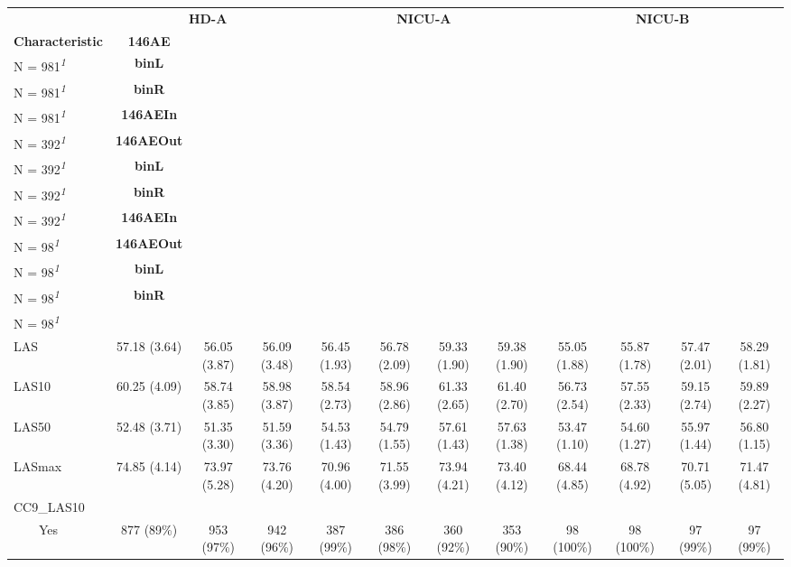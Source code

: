 \begin{table}
\fontsize{12.0pt}{14.4pt}\selectfont
\begin{tabular*}{\linewidth}{@{\extracolsep{\fill}}lccccccccccc}
\toprule
 & \multicolumn{3}{c}{\textbf{HD-A}} & \multicolumn{4}{c}{\textbf{NICU-A}} & \multicolumn{4}{c}{\textbf{NICU-B}} \\ 
\cmidrule(lr){2-4} \cmidrule(lr){5-8} \cmidrule(lr){9-12}
\textbf{Characteristic} & \textbf{146AE}\\
N = 981\textsuperscript{\textit{1}} & \textbf{binL}\\
N = 981\textsuperscript{\textit{1}} & \textbf{binR}\\
N = 981\textsuperscript{\textit{1}} & \textbf{146AEIn}\\
N = 392\textsuperscript{\textit{1}} & \textbf{146AEOut}\\
N = 392\textsuperscript{\textit{1}} & \textbf{binL}\\
N = 392\textsuperscript{\textit{1}} & \textbf{binR}\\
N = 392\textsuperscript{\textit{1}} & \textbf{146AEIn}\\
N = 98\textsuperscript{\textit{1}} & \textbf{146AEOut}\\
N = 98\textsuperscript{\textit{1}} & \textbf{binL}\\
N = 98\textsuperscript{\textit{1}} & \textbf{binR}\\
N = 98\textsuperscript{\textit{1}} \\ 
\midrule\addlinespace[2.5pt]
LAS & 57.18 (3.64) & 56.05 (3.87) & 56.09 (3.48) & 56.45 (1.93) & 56.78 (2.09) & 59.33 (1.90) & 59.38 (1.90) & 55.05 (1.88) & 55.87 (1.78) & 57.47 (2.01) & 58.29 (1.81) \\ 
LAS10 & 60.25 (4.09) & 58.74 (3.85) & 58.98 (3.87) & 58.54 (2.73) & 58.96 (2.86) & 61.33 (2.65) & 61.40 (2.70) & 56.73 (2.54) & 57.55 (2.33) & 59.15 (2.74) & 59.89 (2.27) \\ 
LAS50 & 52.48 (3.71) & 51.35 (3.30) & 51.59 (3.36) & 54.53 (1.43) & 54.79 (1.55) & 57.61 (1.43) & 57.63 (1.38) & 53.47 (1.10) & 54.60 (1.27) & 55.97 (1.44) & 56.80 (1.15) \\ 
LASmax & 74.85 (4.14) & 73.97 (5.28) & 73.76 (4.20) & 70.96 (4.00) & 71.55 (3.99) & 73.94 (4.21) & 73.40 (4.12) & 68.44 (4.85) & 68.78 (4.92) & 70.71 (5.05) & 71.47 (4.81) \\ 
CC9\_LAS10 &  &  &  &  &  &  &  &  &  &  &  \\ 
    Yes & 877 (89\%) & 953 (97\%) & 942 (96\%) & 387 (99\%) & 386 (98\%) & 360 (92\%) & 353 (90\%) & 98 (100\%) & 98 (100\%) & 97 (99\%) & 97 (99\%) \\ 

\end{tabular*}
\end{table}
